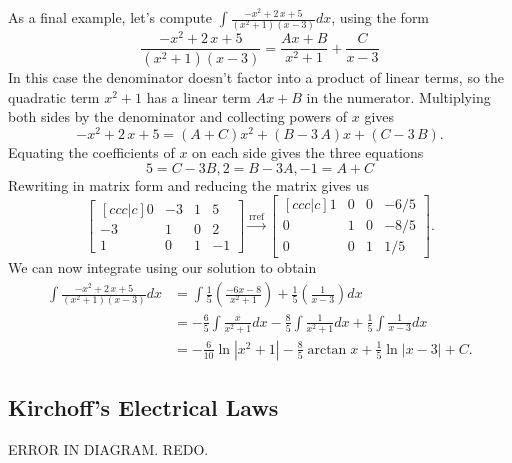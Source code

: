 \documentclass[10pt]{article}
\begin{document}
As a final example, let's compute $\int {\frac {-{x}^{2}+2\,x+5}{ \left( {x}^{2}+1 \right)  \left( x-3
 \right) }}dx$, using the form  
$${\frac {-{x}^{2}+2\,x+5}{ \left( {x}^{2}+1 \right)  \left( x-3
 \right) }}={\frac {Ax+B}{{x}^{2}+1}}+{\frac {C}{x-3}}$$
In this case the denominator doesn't factor into a product of linear terms, so the quadratic term $x^2+1$ has a linear term $Ax+B$ in the numerator.  Multiplying both sides by the denominator and collecting powers of $x$ gives
$$-{x}^{2}+2\,x+5= \left( A+C \right) {x}^{2}+ \left( B-3\,A \right) x+(C-3\,B).$$
Equating the coefficients of $x$ on each side gives the three equations 
$$5=C-3B, 2=B-3A, -1=A+C$$
Rewriting in matrix form and reducing the matrix gives us
$$
\begin{bmatrix}[ccc|c] 
0&-3&1&5\\
-3&1&0&2\\
1&0&1&-1
\end {bmatrix}
\xrightarrow{\text{rref}}
\begin{bmatrix}[ccc|c]
1&0&0&-6/5\\
0&1&0&-8/5\\
0&0&1&1/5
\end {bmatrix} .
$$
We can now integrate using our solution to obtain 
\begin{align*}
\int {\frac {-{x}^{2}+2\,x+5}{ \left( {x}^{2}+1 \right)  \left( x-3\right) }}dx
&= \int {\frac{1}{5}\left(\frac {-6x-8}{{x}^{2}+1}\right)}+ \frac{1}{5}\left({\frac {1}{x-3}}\right)dx \\
&= -\frac{6}{5}\int \frac{x}{x^2+1}dx -\frac{8}{5}\int \frac{1}{x^2+1}dx +\frac{1}{5}\int{\frac {1}{x-3}}dx\\
&= -\frac{6}{10}\ln|{x^2+1}| -\frac{8}{5}\arctan x +\frac{1}{5}\ln|{x-3}|+C.
\end{align*}


\subsection{Kirchoff's Electrical Laws}

ERROR IN DIAGRAM. REDO.
\end{document}
